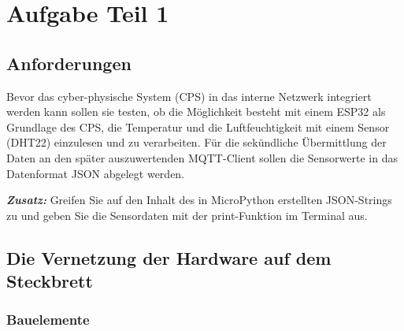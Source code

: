 \documentclass[18pt]{article}
\title{}
\author{Anthony Timmel}
\begin{document}
	
\maketitle

\newpage
	
\tableofcontents

\newpage

\section{Aufgabe Teil 1}

\subsection[Anforderungen]{Anforderungen}
Bevor das cyber-physische System (CPS) in das interne Netzwerk integriert
werden kann sollen sie testen, ob die Möglichkeit besteht mit einem ESP32
als Grundlage des CPS, die Temperatur und die Luftfeuchtigkeit mit einem
Sensor (DHT22) einzulesen und zu verarbeiten. Für die sekündliche
Übermittlung der Daten an den später auszuwertenden MQTT-Client sollen
die Sensorwerte in das Datenformat JSON abgelegt werden.

\textbf{\textit{Zusatz:}} Greifen Sie auf den Inhalt des in MicroPython erstellten JSON-Strings
zu und geben Sie die Sensordaten mit der print-Funktion im Terminal aus.


\subsection[Hardware]{Die Vernetzung der Hardware auf dem Steckbrett}

\subsubsection{Bauelemente}
\end{document}
